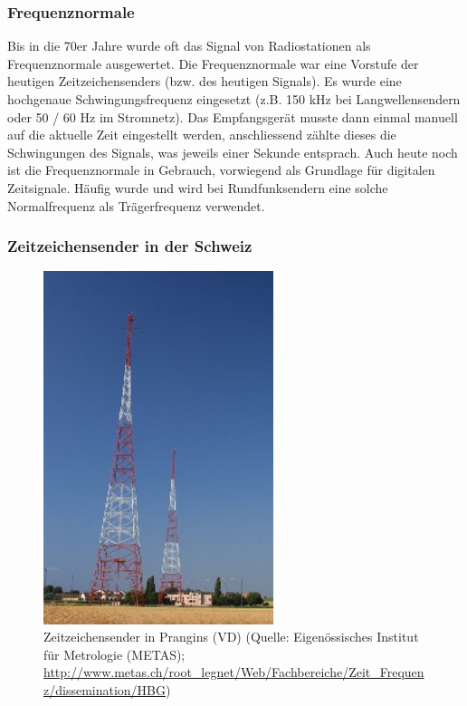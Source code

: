 \subsubsection{Frequenznormale}
Bis in die 70er Jahre wurde oft das Signal von Radiostationen als Frequenznormale ausgewertet. Die Frequenznormale war eine Vorstufe der heutigen Zeitzeichensenders (bzw. des heutigen Signals). Es wurde eine hochgenaue Schwingungsfrequenz eingesetzt (z.B. 150 kHz bei Langwellensendern oder 50 / 60 Hz im Stromnetz). Das Empfangsgerät musste dann einmal manuell auf die aktuelle Zeit eingestellt werden, anschliessend zählte dieses die Schwingungen des Signals, was jeweils einer Sekunde entsprach. Auch heute noch ist die Frequenznormale in Gebrauch, vorwiegend als Grundlage für digitalen Zeitsignale. Häufig wurde und wird bei Rundfunksendern eine solche Normalfrequenz als Trägerfrequenz verwendet.

\subsubsection{Zeitzeichensender in der Schweiz}

\begin{figure}
  \begin{center}
    \includegraphics[width=0.6\textwidth]{./images/Analyse/Prangings_VD_CH.jpg}
  \end{center}
  \caption[Zeitzeichensender in Prangins (VD)]{Zeitzeichensender in Prangins (VD) (Quelle: Eigenössisches Institut für Metrologie (METAS); \url{http://www.metas.ch/root_legnet/Web/Fachbereiche/Zeit_Frequenz/dissemination/HBG})} 
\end{figure}

